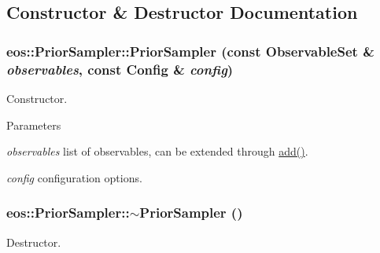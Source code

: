 \subsection{Constructor \& Destructor Documentation}
\hypertarget{classeos_1_1PriorSampler_afa682fec47cec9d61b44709b1e8f4ea3}{
\subsubsection[{PriorSampler}]{\setlength{\rightskip}{0pt plus 5cm}eos::PriorSampler::PriorSampler (const {\bf ObservableSet} \& {\em observables}, \/  const {\bf Config} \& {\em config})}}
\label{classeos_1_1PriorSampler_afa682fec47cec9d61b44709b1e8f4ea3}
Constructor. 
\begin{DoxyParams}{Parameters}
\item[{\em observables}]list of observables, can be extended through \hyperlink{classeos_1_1PriorSampler_aedf28860d2238779355f6fd583555851}{add()}. \item[{\em config}]configuration options. \end{DoxyParams}
\hypertarget{classeos_1_1PriorSampler_ad58ef7a11610b6c0bbbec96a9189395f}{
\subsubsection[{$\sim$PriorSampler}]{\setlength{\rightskip}{0pt plus 5cm}eos::PriorSampler::$\sim$PriorSampler ()}}
\label{classeos_1_1PriorSampler_ad58ef7a11610b6c0bbbec96a9189395f}
Destructor. 

